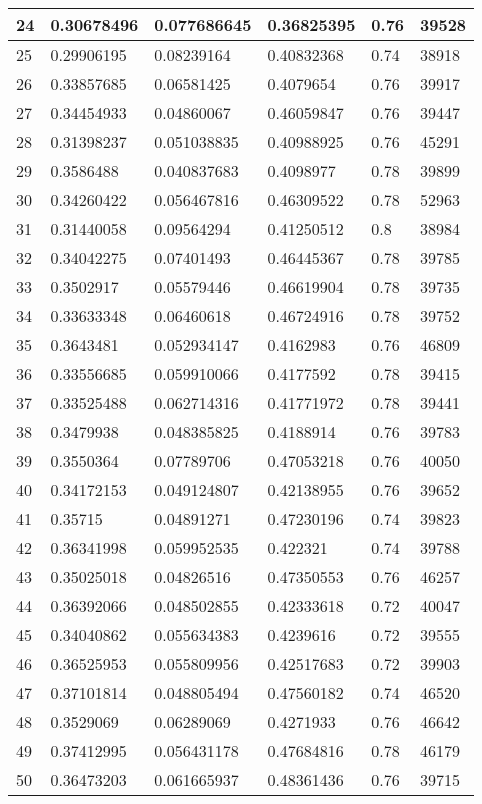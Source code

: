 \begin{longtable}{|l|l|l|l|l|l|}
24 & 0.30678496 & 0.077686645 & 0.36825395 & 0.76 & 39528 \\ \hline 
25 & 0.29906195 & 0.08239164 & 0.40832368 & 0.74 & 38918 \\ \hline 
26 & 0.33857685 & 0.06581425 & 0.4079654 & 0.76 & 39917 \\ \hline 
27 & 0.34454933 & 0.04860067 & 0.46059847 & 0.76 & 39447 \\ \hline 
28 & 0.31398237 & 0.051038835 & 0.40988925 & 0.76 & 45291 \\ \hline 
29 & 0.3586488 & 0.040837683 & 0.4098977 & 0.78 & 39899 \\ \hline 
30 & 0.34260422 & 0.056467816 & 0.46309522 & 0.78 & 52963 \\ \hline 
31 & 0.31440058 & 0.09564294 & 0.41250512 & 0.8 & 38984 \\ \hline 
32 & 0.34042275 & 0.07401493 & 0.46445367 & 0.78 & 39785 \\ \hline 
33 & 0.3502917 & 0.05579446 & 0.46619904 & 0.78 & 39735 \\ \hline 
34 & 0.33633348 & 0.06460618 & 0.46724916 & 0.78 & 39752 \\ \hline 
35 & 0.3643481 & 0.052934147 & 0.4162983 & 0.76 & 46809 \\ \hline 
36 & 0.33556685 & 0.059910066 & 0.4177592 & 0.78 & 39415 \\ \hline 
37 & 0.33525488 & 0.062714316 & 0.41771972 & 0.78 & 39441 \\ \hline 
38 & 0.3479938 & 0.048385825 & 0.4188914 & 0.76 & 39783 \\ \hline 
39 & 0.3550364 & 0.07789706 & 0.47053218 & 0.76 & 40050 \\ \hline 
40 & 0.34172153 & 0.049124807 & 0.42138955 & 0.76 & 39652 \\ \hline 
41 & 0.35715 & 0.04891271 & 0.47230196 & 0.74 & 39823 \\ \hline 
42 & 0.36341998 & 0.059952535 & 0.422321 & 0.74 & 39788 \\ \hline 
43 & 0.35025018 & 0.04826516 & 0.47350553 & 0.76 & 46257 \\ \hline 
44 & 0.36392066 & 0.048502855 & 0.42333618 & 0.72 & 40047 \\ \hline 
45 & 0.34040862 & 0.055634383 & 0.4239616 & 0.72 & 39555 \\ \hline 
46 & 0.36525953 & 0.055809956 & 0.42517683 & 0.72 & 39903 \\ \hline 
47 & 0.37101814 & 0.048805494 & 0.47560182 & 0.74 & 46520 \\ \hline 
48 & 0.3529069 & 0.06289069 & 0.4271933 & 0.76 & 46642 \\ \hline 
49 & 0.37412995 & 0.056431178 & 0.47684816 & 0.78 & 46179 \\ \hline 
50 & 0.36473203 & 0.061665937 & 0.48361436 & 0.76 & 39715 \\ \hline 
\end{longtable}